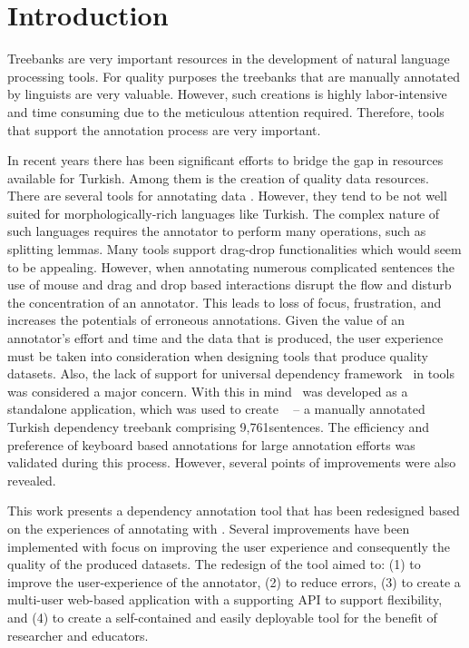 \section{Introduction}
\label{sec:introduction}

Treebanks are very important resources in the development of natural language processing tools.
For quality purposes the treebanks that are manually annotated by linguists are very valuable. 
However, such creations  is highly labor-intensive and time consuming due to the meticulous attention required.
Therefore, tools that support the annotation process are very important. 

In recent years there has been significant efforts to bridge the gap in resources available for Turkish. 
Among them is the creation of quality data resources. 
There are several tools for annotating data \cite{brat} \cite{dgannotator}. 
However, they tend to be not well suited for morphologically-rich languages like Turkish.
The complex nature of such languages requires the annotator to perform many operations, such as splitting lemmas.
Many tools support drag-drop functionalities which would seem to be appealing. 
However, when annotating numerous complicated sentences the use of mouse and drag and drop based interactions disrupt the flow and disturb the concentration of an annotator. 
This leads to loss of focus, frustration, and increases the potentials of erroneous annotations.
Given the value of an annotator's effort and time and the data that is produced, the user experience must be taken into consideration when designing tools that produce quality datasets. 
Also, the lack of support for universal dependency framework~\cite{UD-main} in tools was considered a major concern.
With this in mind \boatvone\ was developed as a standalone application, which was used to create \bountreebank~\cite{turk-etal-2019-turkish,trk2020resources,UD-Boun-Treebank} -- a manually annotated Turkish dependency treebank comprising 9,761sentences.
The efficiency and preference of keyboard based annotations for large annotation efforts was validated during this process. 
However, several points of improvements were also revealed.  

This work presents a dependency annotation tool that has been redesigned based on the experiences of annotating with \boatvone.
Several improvements have been implemented with focus on improving the user experience and consequently the quality of the produced datasets.
The redesign of the tool aimed to: (1) to improve the user-experience of the annotator, (2) to reduce errors, (3) to create a multi-user web-based application with a supporting API to support flexibility, and (4) to create a self-contained and easily deployable tool for the benefit of researcher and educators. 

